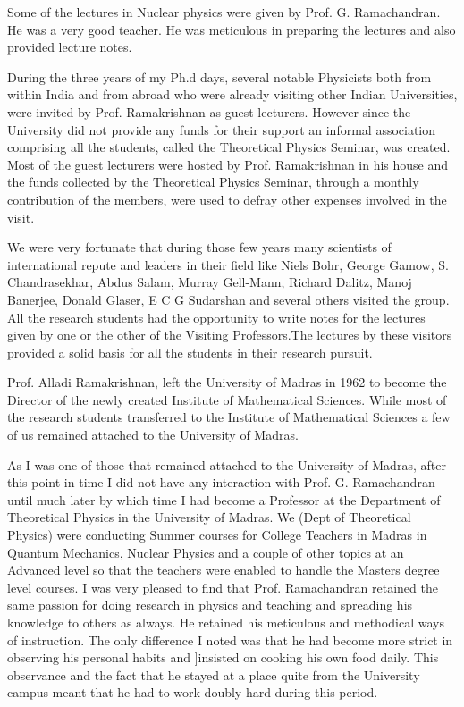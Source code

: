 Some of the lectures in Nuclear physics were given by Prof. G. Ramachandran. He was a very good teacher. He was meticulous in preparing the lectures and also provided lecture notes. 

During the three years of my Ph.d days, several notable Physicists both from within India and from abroad who were already visiting other Indian Universities, were invited  by Prof. Ramakrishnan as guest lecturers. However since the University did not provide any funds for their support an informal association comprising all the students, called the Theoretical Physics Seminar, was created. Most of the guest lecturers were hosted by Prof. Ramakrishnan in his house and the funds collected by the Theoretical Physics Seminar, through a monthly contribution of the members,  were used to defray other expenses involved in the visit.

We were very fortunate that during those few years many scientists of international repute and leaders in their field like Niels Bohr, George Gamow, S. Chandrasekhar, Abdus Salam, Murray Gell-Mann, Richard Dalitz, Manoj Banerjee, Donald Glaser, E C G Sudarshan and several others visited the group. All the research students had  the opportunity to write notes for the lectures given by one or the other of the Visiting Professors.The lectures by these visitors provided a solid basis for all the students in their research pursuit. 

Prof. Alladi Ramakrishnan, left the University of Madras in 1962 to become  the Director of the newly created Institute of Mathematical Sciences. While most of the research students transferred to the Institute of Mathematical Sciences a few of us remained attached to the University of Madras.

As I was one of those that remained attached to the University of  Madras, after this point in time I did not have any interaction with Prof. G. Ramachandran until much later by which time I had become a Professor at the Department of Theoretical Physics in the University of Madras. We (Dept of Theoretical Physics) were conducting Summer courses for College Teachers in Madras in Quantum Mechanics, Nuclear Physics and a couple of other topics at an Advanced level so that the teachers were enabled to handle the Masters degree level courses. I was very pleased to find that Prof. Ramachandran retained the same passion for doing research in physics and teaching and spreading his knowledge to others as always. He retained his meticulous and methodical ways of instruction. The only difference I noted was that he had become more strict in observing his personal habits and ]insisted on cooking his own food daily. This observance and the fact that he stayed at a place quite from the University campus meant that he had to work doubly hard during this period. 

